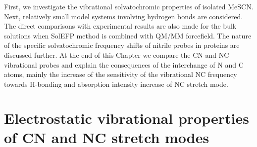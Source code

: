 \documentclass[a4paper,titlepage,twoside,fleqn,12pt]{book}
\begin{document}
\begin{refsection}
First, we investigate
the vibrational solvatochromic properties of isolated
MeSCN. Next, relatively small model systems
involving hydrogen bonds are considered. The direct
comparisons with experimental results are also made for the bulk
solutions when SolEFP method is combined with QM/MM forcefield. 
The nature of the specific
solvatochromic frequency shifts of nitrile probes in proteins
are discussed further. At the end of this Chapter we compare
the CN and NC vibrational probes and explain the consequences of the 
interchange of N and C atoms, mainly the increase of the sensitivity
of the vibrational NC frequency
towards H-bonding and absorption intensity increase of NC stretch mode.

\section{Electrostatic vibrational properties of CN and NC stretch modes}


\end{refsection}
\end{document}
